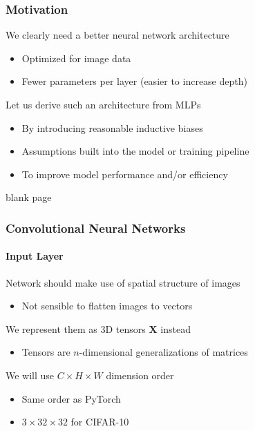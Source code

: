 \documentclass[xetex,professionalfont]{beamer}
\renewcommand\emph[1]{\textcolor{tuwcvl_cvl_blue}{#1}}
\renewcommand{\vec}[1]{\ensuremath{\mathbf{#1}}}
\newcommand{\vX}{\vec{X}}
\begin{document}
\begin{frame}
\frametitle{Motivation}

We clearly need a better neural network architecture
\begin{itemize}
    \item Optimized for image data
    \item Fewer parameters per layer (easier to increase depth) %
\end{itemize}

\bigskip

Let us derive such an architecture from MLPs
\begin{itemize}
    \item By introducing reasonable \emph{inductive biases}
    \item Assumptions built into the model or training pipeline
    \item To improve model performance and/or efficiency
\end{itemize}

\end{frame}


{
\begin{frame}


\begin{center}
\textcolor[rgb]{0.9,0.9,0.9}{blank page}
\end{center}

\end{frame}
}


\begin{frame}
\frametitle{Convolutional Neural Networks}
\framesubtitle{Input Layer}

Network should make use of spatial structure of images
\begin{itemize}
    \item Not sensible to flatten images to vectors
\end{itemize}

\bigskip

We represent them as 3D tensors $\vX$ instead
\begin{itemize}
    \item \emph{Tensors} are $n$-dimensional generalizations of matrices
\end{itemize}

\bigskip

We will use $C\times H\times W$ dimension order
\begin{itemize}
    \item Same order as PyTorch
    \item $3\times32\times32$ for CIFAR-10
\end{itemize}

\end{frame}
\end{document}
